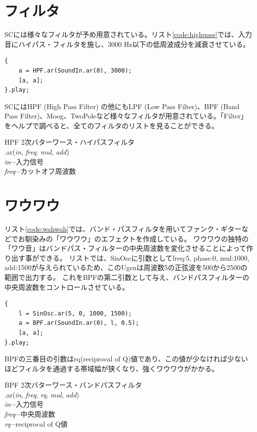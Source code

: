 \documentclass{jsarticle}
\begin{document}
\section{フィルタ}
SCには様々なフィルタが予め用意されている。リスト\ref{code:highpass}では、入力音にハイパス・フィルタを施し、3000 Hz以下の低周波成分を減衰させている。

\begin{lstlisting}[caption=ハイパス・フィルタ, label=code:highpass]
{
	a = HPF.ar(SoundIn.ar(0), 3000);
	[a, a];
}.play;
\end{lstlisting}

SCにはHPF (High Pass Filter) の他にもLPF (Low Pass Filter)、BPF (Band Pass Filter)、Moog、TwoPoleなど様々なフィルタが用意されている。「Filter」をヘルプで調べると、全てのフィルタのリストを見ることができる。

\begin{itembox}[l]{HPF}
{\footnotesize 
2次バターワース・ハイパスフィルタ\\
.ar({\it in}, {\it freq}, {\it mul}, {\it add})\\

{\it in}$\cdots$入力信号\\
{\it freq}$\cdots$カットオフ周波数\\
}
\end{itembox}

\section{ワウワウ}
リスト\ref{code:wahwah}では、バンド・パスフィルタを用いてファンク・ギターなどでお馴染みの「ワウワウ」のエフェクトを作成している。
ワウワウの独特の「ワウ音」はバンドパス・フィルターの中央周波数を変化させることによって作り出す事ができる。
リストでは、SinOscに引数としてfreq:5, phase:0, mul:1000, add:1500が与えられているため、このUgenは周波数5の正弦波を500から2500の範囲で出力する。
これをBPFの第二引数として与え、バンドパスフィルターの中央周波数をコントロールさせている。
\begin{lstlisting}[caption=ワウワウ, label=code:wahwah]
{
	l = SinOsc.ar(5, 0, 1000, 1500);
	a = BPF.ar(SoundIn.ar(0), l, 0.5);
	[a, a];
}.play;
\end{lstlisting}

BPFの三番目の引数はrq(reciprocal of Q)値であり、この値が少なければ少ないほどフィルタを通過する帯域幅が狭くなり、強くワウワウがかかる。

\begin{itembox}[l]{BPF}
{\footnotesize 
2次バターワース・バンドパスフィルタ\\
.ar({\it in}, {\it freq}, {\it rq}, {\it mul}, {\it add})\\

{\it in}$\cdots$入力信号\\
{\it freq}$\cdots$中央周波数\\
{\it rq}$\cdots$reciprocal of Q値\\
}
\end{itembox}
\end{document}
